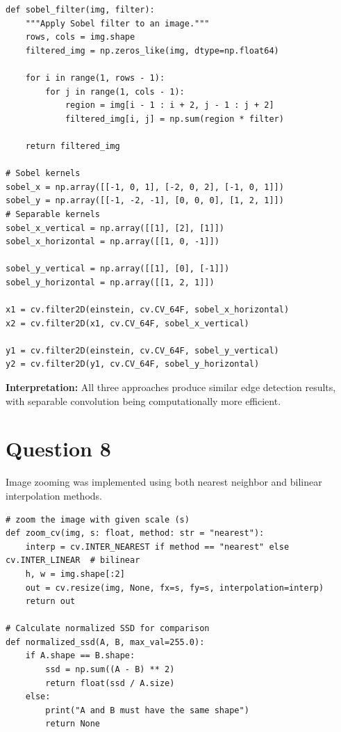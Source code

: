 \documentclass[10pt,a4paper]{article}
\begin{document}
\begin{lstlisting}[caption=Custom Sobel filtering implementation]
def sobel_filter(img, filter):
    """Apply Sobel filter to an image."""
    rows, cols = img.shape
    filtered_img = np.zeros_like(img, dtype=np.float64)

    for i in range(1, rows - 1):
        for j in range(1, cols - 1):
            region = img[i - 1 : i + 2, j - 1 : j + 2]
            filtered_img[i, j] = np.sum(region * filter)

    return filtered_img

# Sobel kernels
sobel_x = np.array([[-1, 0, 1], [-2, 0, 2], [-1, 0, 1]])
sobel_y = np.array([[-1, -2, -1], [0, 0, 0], [1, 2, 1]])
# Separable kernels
sobel_x_vertical = np.array([[1], [2], [1]])
sobel_x_horizontal = np.array([[1, 0, -1]])

sobel_y_vertical = np.array([[1], [0], [-1]])
sobel_y_horizontal = np.array([[1, 2, 1]])

x1 = cv.filter2D(einstein, cv.CV_64F, sobel_x_horizontal)
x2 = cv.filter2D(x1, cv.CV_64F, sobel_x_vertical)

y1 = cv.filter2D(einstein, cv.CV_64F, sobel_y_vertical)
y2 = cv.filter2D(y1, cv.CV_64F, sobel_y_horizontal)
\end{lstlisting}

\textbf{Interpretation:} All three approaches produce similar edge detection results, with separable convolution being computationally more efficient.

\section{Question 8}
Image zooming was implemented using both nearest neighbor and bilinear interpolation methods.

\begin{lstlisting}[caption=Image zooming implementation]
# zoom the image with given scale (s)
def zoom_cv(img, s: float, method: str = "nearest"):
    interp = cv.INTER_NEAREST if method == "nearest" else cv.INTER_LINEAR  # bilinear
    h, w = img.shape[:2]
    out = cv.resize(img, None, fx=s, fy=s, interpolation=interp)
    return out

# Calculate normalized SSD for comparison
def normalized_ssd(A, B, max_val=255.0):
    if A.shape == B.shape:
        ssd = np.sum((A - B) ** 2)
        return float(ssd / A.size)
    else:
        print("A and B must have the same shape")
        return None
\end{lstlisting}
\end{document}
